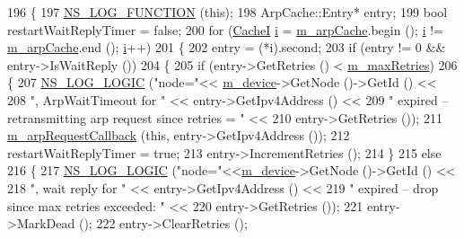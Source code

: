 \begin{DoxyCode}
196 \{
197   \hyperlink{log-macros-disabled_8h_a90b90d5bad1f39cb1b64923ea94c0761}{NS\_LOG\_FUNCTION} (\textcolor{keyword}{this});
198   ArpCache::Entry* entry;
199   \textcolor{keywordtype}{bool} restartWaitReplyTimer = \textcolor{keyword}{false};
200   \textcolor{keywordflow}{for} (\hyperlink{classns3_1_1ArpCache_a22c6fbe2d2b3b00d995ed13ec6a0c9cb}{CacheI} \hyperlink{bernuolliDistribution_8m_a6f6ccfcf58b31cb6412107d9d5281426}{i} = \hyperlink{classns3_1_1ArpCache_a952de05903ff6b400c332c1bad8e0fc6}{m\_arpCache}.begin (); \hyperlink{bernuolliDistribution_8m_a6f6ccfcf58b31cb6412107d9d5281426}{i} != \hyperlink{classns3_1_1ArpCache_a952de05903ff6b400c332c1bad8e0fc6}{m\_arpCache}.end (); 
      \hyperlink{bernuolliDistribution_8m_a6f6ccfcf58b31cb6412107d9d5281426}{i}++) 
201     \{
202       entry = (*i).second;
203       \textcolor{keywordflow}{if} (entry != 0 && entry->IsWaitReply ())
204         \{
205           \textcolor{keywordflow}{if} (entry->GetRetries () < \hyperlink{classns3_1_1ArpCache_a24f0460babb1745ff532b16710846ab9}{m\_maxRetries})
206             \{
207               \hyperlink{group__logging_ga88acd260151caf2db9c0fc84997f45ce}{NS\_LOG\_LOGIC} (\textcolor{stringliteral}{"node="}<< \hyperlink{classns3_1_1ArpCache_abeff23a1b2276b8cca9b3a023bce2850}{m\_device}->GetNode ()->GetId () <<
208                             \textcolor{stringliteral}{", ArpWaitTimeout for "} << entry->GetIpv4Address () <<
209                             \textcolor{stringliteral}{" expired -- retransmitting arp request since retries = "} <<
210                             entry->GetRetries ());
211               \hyperlink{classns3_1_1ArpCache_a91797ea0de773ea3b9ba84e8cd42a3e0}{m\_arpRequestCallback} (\textcolor{keyword}{this}, entry->GetIpv4Address ());
212               restartWaitReplyTimer = \textcolor{keyword}{true};
213               entry->IncrementRetries ();
214             \}
215           \textcolor{keywordflow}{else}
216             \{
217               \hyperlink{group__logging_ga88acd260151caf2db9c0fc84997f45ce}{NS\_LOG\_LOGIC} (\textcolor{stringliteral}{"node="}<<\hyperlink{classns3_1_1ArpCache_abeff23a1b2276b8cca9b3a023bce2850}{m\_device}->GetNode ()->GetId () <<
218                             \textcolor{stringliteral}{", wait reply for "} << entry->GetIpv4Address () <<
219                             \textcolor{stringliteral}{" expired -- drop since max retries exceeded: "} <<
220                             entry->GetRetries ());
221               entry->MarkDead ();
222               entry->ClearRetries ();

\end{DoxyCode}
